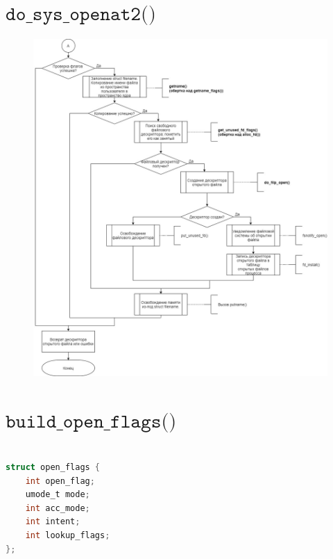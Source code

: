 \documentclass[a4paper,14pt]{extreport}
\begin{document}
\section{$\texttt{do\_sys\_openat2()}$}
\begin{figure}[H]
	\centering
	\includegraphics[scale=0.45]{img/open2.jpg}
\end{figure}










\section{$\texttt{build\_open\_flags()}$}

\begin{lstlisting}[language=c, caption=Структура open_flags]

struct open_flags {
	int open_flag;
	umode_t mode;
	int acc_mode;
	int intent;
	int lookup_flags;
};
\end{lstlisting}
\end{document}
